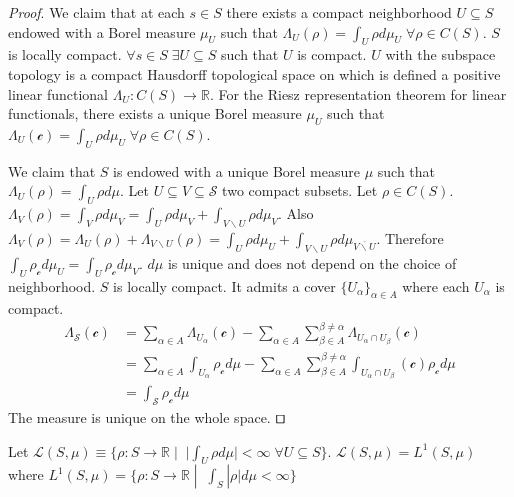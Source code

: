\documentclass[smallextended]{svjour3}
\numberwithin{equation}{section}
\renewenvironment{proof}{\emph{Proof}.}{\hfill\(\qed\)}
\begin{document}
\begin{proof}
	We claim that at each $s \in S$ there exists a compact neighborhood $U \subseteq S$ endowed with a Borel measure $\mu_U$ such that $\Lambda_U (\rho) = \int_U \rho d \mu_U \; \forall \rho \in C(S)$. $S$ is locally compact. $\forall s \in S \; \exists U \subseteq S$ such that $U$ is compact. $U$ with the subspace topology is a compact Hausdorff topological space on which is defined a positive linear functional $\Lambda_U : C(S) \rightarrow \mathbb{R}$. For the Riesz representation theorem for linear functionals, there exists a unique Borel measure $\mu_U$ such that $\Lambda_U (\mathcal{c}) = \int_U \rho d \mu_U \; \forall \rho \in C(S)$.
	
	We claim that $S$ is endowed with a unique Borel measure $\mu$ such that $\Lambda_U (\rho) = \int_U \rho d \mu$. Let $U \subseteq V \subseteq \mathcal{S}$ two compact subsets. Let $\rho \in C(S)$. $\Lambda_V (\rho) = \int_V \rho d \mu_V = \int_U \rho d \mu_V + \int_{V\backslash U} \rho d \mu_V$. Also $\Lambda_V (\rho) = \Lambda_U (\rho) + \Lambda_{V\backslash U} (\rho) = \int_U \rho d \mu_U + \int_{V \backslash U} \rho d \mu_{\overline{V \backslash U}} $. Therefore $\int_{U} \rho_{\mathcal{c}} d \mu_U = \int_{U} \rho_{\mathcal{c}} d \mu_V$. $d\mu$ is unique and does not depend on the choice of neighborhood. $S$ is locally compact. It admits a cover $\{U_\alpha\}_{\alpha \in A}$ where each $U_\alpha$ is compact.
	\begin{align*}
	\Lambda_{\mathcal{S}}(\mathcal{c}) &= \sum \limits_{\alpha \in A} \Lambda_{U_\alpha}(\mathcal{c}) - \sum \limits_{\alpha \in A} \sum \limits_{\beta \in A}^{\beta \neq\alpha} \Lambda_{U_\alpha \cap U_\beta}(\mathcal{c}) \\
	&= \sum \limits_{\alpha \in A} \int_{U_\alpha} \rho_{\mathcal{c}} d\mu - \sum \limits_{\alpha \in A} \sum \limits_{\beta \in A}^{\beta \neq\alpha} \int_{U_\alpha \cap U_\beta}(\mathcal{c}) \rho_{\mathcal{c}} d\mu \\
	&= \int_{\mathcal{S}} \rho_{\mathcal{c}} d\mu
	\end{align*}
	The measure is unique on the whole space.
\end{proof}

\begin{thrm}\label{everywhere_integrable_is_lebesgue_integrable}
	Let $\mathcal{L}(S,\mu) \equiv \{ \rho : S \rightarrow \mathbb{R} \; | \;\; |\int_{U} \rho d\mu| < \infty \; \forall U \subseteq S\}$. $\mathcal{L}(S,\mu)=L^1(S,\mu)$ where $L^1(S,\mu) = \{ \rho : S \rightarrow \mathbb{R} \; | \;\; \int_{S} |\rho| d\mu < \infty \}$
\end{thrm}
\end{document}
